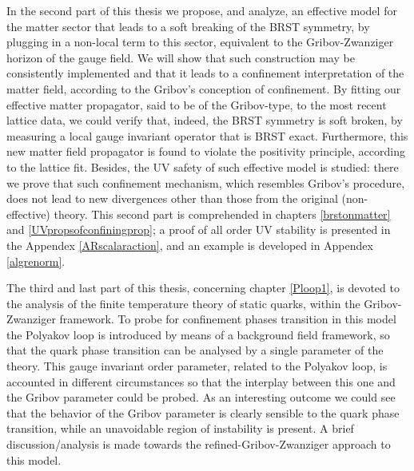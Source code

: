 In the second part of this thesis we propose, and analyze, an effective model for the matter
sector that leads to a soft breaking of the BRST symmetry, by plugging in a non-local term to
this sector, equivalent to the Gribov-Zwanziger horizon of the gauge field.
We will show that such construction may be consistently implemented and that it leads to a
confinement interpretation of the matter field, according to the Gribov's conception of
confinement. By fitting our effective matter propagator, said to be of the Gribov-type, to the
most recent lattice data, we could verify that, indeed, the BRST symmetry is soft broken, by
measuring a local gauge invariant operator that is BRST exact. Furthermore, this new matter
field propagator is found to violate the positivity principle, according to the lattice
fit.  Besides, the UV safety of such effective model is studied: there we prove that such
confinement mechanism, which resembles Gribov's procedure, does not lead to new divergences
other than those from the original (non-effective) theory. This second part is comprehended in
chapters \ref{brstonmatter} and \ref{UVpropsofconfiningprop}; a proof of all order UV stability
is presented in the Appendex \ref{ARscalaraction}, and an example is developed in Appendex
\ref{algrenorm}.

\newpage
The third and last part of this thesis, concerning chapter \ref{Ploop1}, is devoted to the
analysis of the finite temperature theory of static quarks, within the Gribov-Zwanziger
framework. To probe for confinement phases transition in this model the Polyakov loop is
introduced by means of a background field framework, so that the quark phase transition can be
analysed by a single parameter of the theory. This gauge invariant order parameter, related to
the Polyakov loop, is accounted in different circumstances so that the interplay
between this one and the Gribov parameter could be probed. As an interesting outcome we could
see that the behavior of the Gribov parameter is clearly sensible to the quark phase
transition, while an unavoidable region of instability is present. A brief discussion/analysis
is made towards the refined-Gribov-Zwanziger approach to this model.


